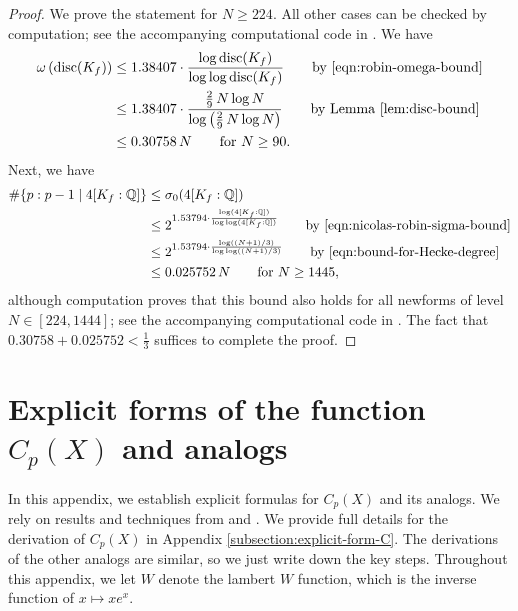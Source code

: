 \documentclass[11pt,letterpaper,reqno]{amsart}
\theoremstyle{definition}
\numberwithin{equation}{section}
\numberwithin{figure}{section}
\numberwithin{table}{section}
\begin{document}
\begin{proof}
    We prove the statement for $N \geq 224$. All other cases can be checked by computation; see the accompanying computational code in \cite{code2}. We have
    \begin{align}
        \omega\left( \operatorname{disc}(K_f) \right) &\leq 1.38407 \cdot \frac{\log \operatorname{disc}(K_f)}{\log \log \operatorname{disc}(K_f)} \qquad \text{by \eqref{eqn:robin-omega-bound}}\\
        &\leq 1.38407 \cdot \frac{\frac{2}{9} \, N  \log N}{\log \left( \frac{2}{9} \, N  \log N \right)} \qquad \text{by Lemma \ref{lem:disc-bound}}\\
        &\leq 0.30758 \,  N \qquad \text{for $N \geq 90$}.
    \end{align}
    Next, we have
    \begin{align}
        \#\{ p : p - 1 \mid 4[K_f: \mathbb{Q}]\} &\leq \sigma_0(4[K_f: \mathbb{Q}])\\
        &\leq 2^{1.53794 \cdot \frac{\log(4[K_f: \mathbb{Q}]) }{\log \log (4[K_f: \mathbb{Q}])}} \qquad \text{by \eqref{eqn:nicolas-robin-sigma-bound}}\\
        &\leq 2^{1.53794 \cdot \frac{\log((N + 1)/3) }{\log \log ((N + 1)/3)}} \qquad \text{by \eqref{eqn:bound-for-Hecke-degree}}\\
        &\leq 0.025752 \, N \qquad \text{for $N \geq 1445$},
    \end{align}
    although computation proves that this bound also holds for all newforms of level $N \in [224, 1444]$; see the accompanying computational code in \cite{code1}. The fact that $0.30758 + 0.025752 < \frac{1}{3}$ suffices to complete the proof.
\end{proof}



\appendix

\section{Explicit forms of the function \texorpdfstring{$C_p(X)$}{Cp(X)} and analogs}\label{section:explicit-form-of-function}

In this appendix, we establish explicit formulas for $C_p(X)$ and its analogs. We rely on results and techniques from \cite{KMRX} and \cite{MS07}. We provide full details for the derivation of $C_p(X)$ in Appendix \ref{subsection:explicit-form-C}. The derivations of the other analogs are similar, so we just write down the key steps. Throughout this appendix, we let $W$ denote the lambert $W$ function, which is the inverse function of $x \mapsto xe^x.$
\end{document}
